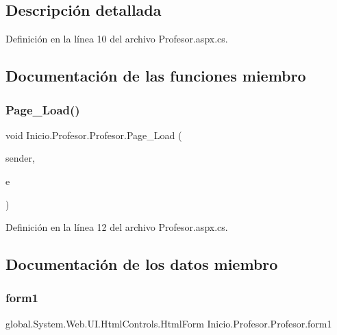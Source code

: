 \subsection{Descripción detallada}


Definición en la línea 10 del archivo Profesor.\+aspx.\+cs.



\subsection{Documentación de las funciones miembro}
\mbox{\label{classInicio_1_1Profesor_1_1Profesor_a2534a4b35b0889254168e0922046017f}} 
\subsubsection{\texorpdfstring{Page\_Load()}{Page\_Load()}}
{\footnotesize\ttfamily void Inicio.\+Profesor.\+Profesor.\+Page\+\_\+\+Load (\begin{DoxyParamCaption}\item[{object}]{sender,  }\item[{Event\+Args}]{e }\end{DoxyParamCaption})\hspace{0.3cm}{\ttfamily [protected]}}



Definición en la línea 12 del archivo Profesor.\+aspx.\+cs.


\begin{DoxyCode}{0}

\end{DoxyCode}


\subsection{Documentación de los datos miembro}
\mbox{\label{classInicio_1_1Profesor_1_1Profesor_a27da636e45ba383475b5b89d227a3cb1}} 
\subsubsection{\texorpdfstring{form1}{form1}}
{\footnotesize\ttfamily global.\+System.\+Web.\+U\+I.\+Html\+Controls.\+Html\+Form Inicio.\+Profesor.\+Profesor.\+form1\hspace{0.3cm}{\ttfamily [protected]}}



